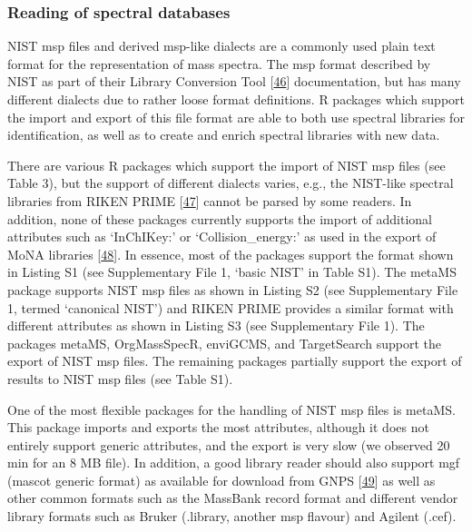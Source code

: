 \documentclass[]{article}
\begin{document}
\hypertarget{reading-of-spectral-databases}{%
\subsubsection{Reading of spectral databases}\label{reading-of-spectral-databases}}

NIST msp files and derived msp-like dialects are a commonly used plain text format for the representation of mass spectra. The msp format described by NIST as part of their Library Conversion Tool {[}\protect\hyperlink{ref-thenationalinstituteofstandardsandtechnology_website_2012}{46}{]} documentation, but has many different dialects due to rather loose format definitions. R packages which support the import and export of this file format are able to both use spectral libraries for identification, as well as to create and enrich spectral libraries with new data.

There are various R packages which support the import of NIST msp files (see Table 3), but the support of different dialects varies, e.g., the NIST-like spectral libraries from RIKEN PRIME {[}\protect\hyperlink{ref-tsugawa_2015}{47}{]} cannot be parsed by some readers. In addition, none of these packages currently supports the import of additional attributes such as `InChIKey:' or `Collision\_energy:' as used in the export of MoNA libraries {[}\protect\hyperlink{ref-massbankofnorthamerica_website_nd}{48}{]}. In essence, most of the packages support the format shown in Listing S1 (see Supplementary File 1, `basic NIST' in Table S1). The metaMS package supports NIST msp files as shown in Listing S2 (see Supplementary File 1, termed `canonical NIST') and RIKEN PRIME provides a similar format with different attributes as shown in Listing S3 (see Supplementary File 1). The packages metaMS, OrgMassSpecR, enviGCMS, and TargetSearch support the export of NIST msp files. The remaining packages partially support the export of results to NIST msp files (see Table S1).

One of the most flexible packages for the handling of NIST msp files is metaMS. This package imports and exports the most attributes, although it does not entirely support generic attributes, and the export is very slow (we observed 20 min for an 8 MB file). In addition, a good library reader should also support mgf (mascot generic format) as available for download from GNPS {[}\protect\hyperlink{ref-wang_2016}{49}{]} as well as other common formats such as the MassBank record format and different vendor library formats such as Bruker (.library, another msp flavour) and Agilent (.cef).
\end{document}
